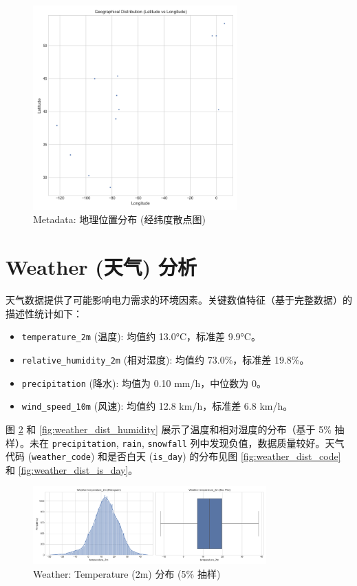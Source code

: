 \documentclass{article} %
\begin{document}
\begin{figure}[H]
    \centering
    \includegraphics[width=0.7\textwidth]{../plots/metadata_location_scatter.png}
    \caption{Metadata: 地理位置分布 (经纬度散点图)}
    \label{fig:metadata_location_scatter}
\end{figure}

\section{Weather (天气) 分析}
\label{sec:weather_analysis}

天气数据提供了可能影响电力需求的环境因素。关键数值特征（基于完整数据）的描述性统计如下：
\begin{itemize}
    \item \texttt{temperature\_2m} (温度): 均值约 13.0°C，标准差 9.9°C。
    \item \texttt{relative\_humidity\_2m} (相对湿度): 均值约 73.0\%，标准差 19.8\%。
    \item \texttt{precipitation} (降水): 均值为 0.10 mm/h，中位数为 0。
    \item \texttt{wind\_speed\_10m} (风速): 均值约 12.8 km/h，标准差 6.8 km/h。
\end{itemize}
图 \ref{fig:weather_dist_temp} 和 \ref{fig:weather_dist_humidity} 展示了温度和相对湿度的分布（基于 5\% 抽样）。未在 \texttt{precipitation}, \texttt{rain}, \texttt{snowfall} 列中发现负值，数据质量较好。天气代码 (\texttt{weather\_code}) 和是否白天 (\texttt{is\_day}) 的分布见图 \ref{fig:weather_dist_code} 和 \ref{fig:weather_dist_is_day}。

\begin{figure}[H]
    \centering
    \includegraphics[width=0.8\textwidth]{../plots/weather_distribution_temperature_2m.png}
    \caption{Weather: Temperature (2m) 分布 (5\% 抽样)}
    \label{fig:weather_dist_temp}
\end{figure}
\end{document}
